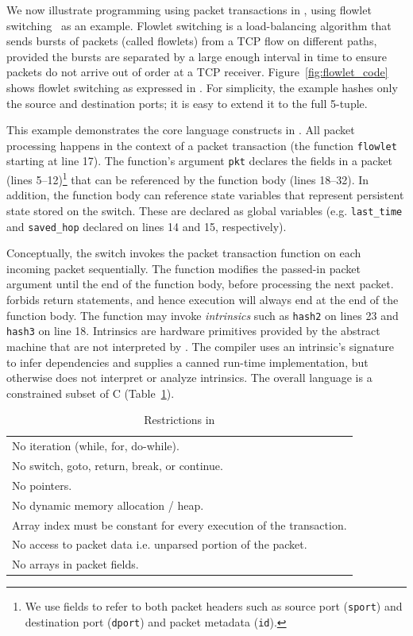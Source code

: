 We now illustrate programming using packet transactions in \pktlanguage, using
flowlet switching~\cite{flowlets} as an example. Flowlet switching is a
load-balancing algorithm that sends bursts of packets (called flowlets) from a
TCP flow on different paths, provided the bursts are separated by a large
enough interval in time to ensure packets do not arrive out of order at a TCP
receiver. Figure~\ref{fig:flowlet_code} shows flowlet switching as expressed in
\pktlanguage. For simplicity, the example hashes only the source and
destination ports; it is easy to extend it to the full 5-tuple.

This example demonstrates the core language constructs in \pktlanguage. All
packet processing happens in the context of a packet transaction (the function
\texttt{flowlet} starting at line 17). The function's argument {\tt pkt}
declares the fields in a packet (lines 5--12)\footnote{We use fields to refer
to both packet headers such as source port ({\tt sport}) and destination port
({\tt dport}) and packet metadata ({\tt id}).} that can be referenced by the
function body (lines 18--32).  In addition, the function body can reference
state variables that represent persistent state stored on the switch. These are
declared as global variables (e.g. \texttt{last\_time} and \texttt{saved\_hop}
declared on lines 14 and 15, respectively).

Conceptually, the switch invokes the packet transaction function on each
incoming packet sequentially. The function modifies the passed-in packet
argument until the end of the function body, before processing the next packet.
\pktlanguage forbids return statements, and hence execution will always end at
the end of the function body. The function may invoke \textit{intrinsics} such
as \texttt{hash2} on lines 23 and \texttt{hash3} on line 18.
Intrinsics are hardware primitives provided by the abstract machine that are
not interpreted by \pktlanguage. The \pktlanguage compiler uses an intrinsic's
signature to infer dependencies and supplies a canned run-time implementation,
but otherwise does not interpret or analyze intrinsics. The overall language is
a constrained subset of C (Table~\ref{tab:restrict}).
\begin{table}
  \begin{tabular}{p{}}
    No iteration (while, for, do-while).\\
    No switch, goto, return, break, or continue.\\
    No pointers.\\
    No dynamic memory allocation / heap.\\
    Array index must be constant for every execution of the transaction.\\
    No access to packet data i.e. unparsed portion of the packet.\\
    No arrays in packet fields.\\
  \end{tabular}
  \caption{Restrictions in \pktlanguage}
  \label{tab:restrict}
\end{table}

